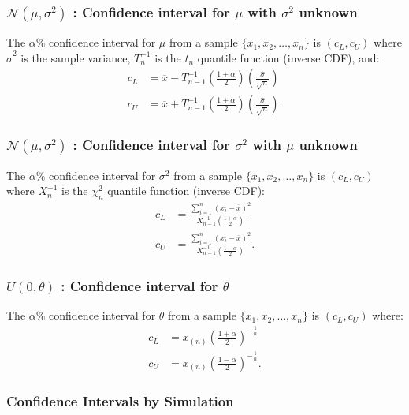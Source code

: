 \documentclass[a4paper, 12pt, twoside]{article}
\begin{document}
\subsubsection{$\mathcal{N}(\mu, \sigma^2)$ : Confidence
    interval for $\mu$ with $\sigma^2$ unknown}

The $\alpha\%$ confidence interval for $\mu$ from a sample
$\{x_1, x_2, \ldots, x_n\}$ is $(c_L, c_U)$ where $\hat\sigma^2$ is
the sample variance, $T^{-1}_{n}$ is the $t_{n}$ quantile function
(inverse CDF), and:
\begin{align*}
    c_L & = \overline{x} - T^{-1}_{n-1}\left(\frac{1 + \alpha}{2}\right)
    \left(\frac{\hat\sigma}{\sqrt{n}}\right)                             \\
    c_U & = \overline{x} + T^{-1}_{n-1}\left(\frac{1 + \alpha}{2}\right)
    \left(\frac{\hat\sigma}{\sqrt{n}}\right).
\end{align*}

\subsubsection{$\mathcal{N}(\mu, \sigma^2)$ : Confidence
    interval for $\sigma^2$ with $\mu$ unknown}

The $\alpha\%$ confidence interval for $\sigma^2$ from a sample
$\{x_1, x_2, \ldots, x_n\}$ is $(c_L, c_U)$ where $X_n^{-1}$ is the
$\chi^2_n$ quantile function (inverse CDF):
\begin{align*}
    c_L & = \frac{\sum_{i = 1}^n(x_i - \overline{x})^2}
    {X_{n-1}^{-1}\left(\frac{1 + \alpha}{2}\right)}     \\
    c_U & = \frac{\sum_{i = 1}^n(x_i - \overline{x})^2}
    {X_{n-1}^{-1}\left(\frac{1 - \alpha}{2}\right)}.
\end{align*}

\subsubsection{$U(0, \theta)$ : Confidence interval for $\theta$}

The $\alpha\%$ confidence interval for $\theta$ from a sample
$\{x_1, x_2, \ldots, x_n\}$ is $(c_L, c_U)$ where:
\begin{align*}
    c_L & = x_{(n)}\left(\frac{1 + \alpha}{2}\right)^{-\frac{1}{n}}  \\
    c_U & = x_{(n)}\left(\frac{1 - \alpha}{2}\right)^{-\frac{1}{n}}.
\end{align*}

\subsubsection{Confidence Intervals by Simulation}
\end{document}
